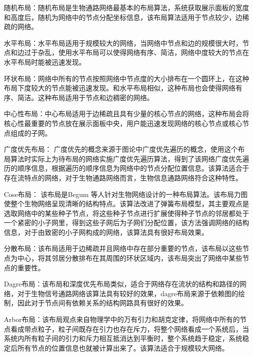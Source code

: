 随机布局：随机布局是生物通路网络最基本的布局算法，系统获取展示面板的宽度和高度后，随机为网络中的节点分配坐标信息，该布局算法适用于节点较少，边稀疏的网络。

水平布局：水平布局适用于规模较大的网络，当网络中节点和边的规模很大时，节点和边过于杂乱，使用水平布局可以使得网络有序、简洁，网络中度较大的节点在水平布局时能被迅速发现。

环状布局：网络中所有的节点按照网络中节点度的大小排布在一个圆环上，在这种布局下度较大的节点能被迅速发现。和水平布局相似，这种布局也会使得网络有序、简洁。这种布局适用于节点和边稠密的网络。

中心性布局：中心布局适用于边稀疏且具有少量的核心节点的网络，这种布局会将核心性最重要的节点放在展示面板中央，用户能迅速发现网络的核心节点或核心节点组成的子网。

广度优先布局： 广度优先的概念来源于图论中广度优先遍历的概念，使用这个布局算法时实际上为待布局的网络实施广度优先遍历算法，得到了该网络广度优先遍历的顺序信息，根据遍历的顺序信息为网络中的节点分配位置信息。该算法适合于存在流特点的网络，对于生物通路网络而言，生物信息通路网络符合这种特性。

Cose布局： 该布局是Begum\cite{An algorithm for automated layout of process description maps drawn in SBGN} 等人针对生物网络设计的一种布局算法。该布局力图使整个生物网络呈现清晰的结构特点。该算法改进了弹簧布局\cite{Spring layout}模型，其主要观点是选取网络中的某些种子节点，将这些种子节点进行扩展使得种子节点的邻居都处于一个紧密的小子网里，得到这些子网后为子网们分配位置，该方法强调网络的结构信息，对于由致密的小子网构成的网络，该算法具有很好布局效果。

分散布局：该布局适用于边稀疏并且网络中存在部分重要的节点，该布局以这些节点为中心，将其邻居分散排布在其周围的环状区域内，该布局突出了网络中某些节点的重要性。

Dagre布局：该布局和深度优先布局类似，适合于网络存在流状的结构和路径的网络，对于生物信号通路网络该算法具有较好的效果，dagre布局来源于依赖图的绘制，因此对于节点间有依赖关系的结构网路具有很好的效果。

Arbor布局：该布局观点来自物理学中的万有引力和胡克定律，将网络中所有的节点看成带点粒子，粒子间既存在引力也存在斥力，将整个网络看成一个系统后，当系统内所有粒子间的引力和斥力相互抵消达到平衡时，整个系统趋于稳定，系统稳定后所有节点的位置信息也就被计算出来了。该算法适合于规模较大网络。

